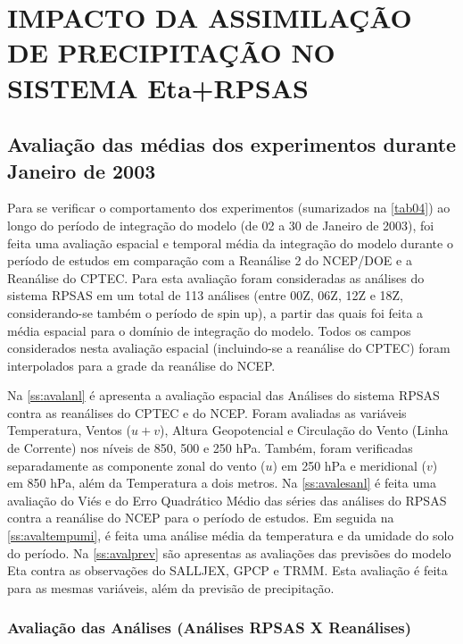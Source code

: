 \hypertarget{estilo:capitulo}{}
\chapter{IMPACTO DA ASSIMILAÇÃO DE PRECIPITAÇÃO NO SISTEMA Eta+RPSAS}
\label{ss:cap3}

\section{Avaliação das médias dos experimentos durante Janeiro de 2003}
\label{ss:avalmedia}

Para se verificar o comportamento dos experimentos (sumarizados na \autoref{tab04}) ao longo do período de integração do modelo (de 02 a 30 de Janeiro de 2003), foi feita uma avaliação espacial e temporal média da integração do modelo durante o período de estudos em comparação com a Reanálise 2 do NCEP/DOE e a Reanálise do CPTEC. Para esta avaliação foram consideradas as análises do sistema RPSAS em um total de 113 análises (entre 00Z, 06Z, 12Z e 18Z, considerando-se também  o período de spin up), a partir das quais foi feita a média espacial para o domínio de integração do modelo. Todos os campos considerados nesta avaliação espacial (incluindo-se a reanálise do CPTEC) foram interpolados para a grade da reanálise do NCEP. 

Na \autoref{ss:avalanl} é apresenta a avaliação espacial das Análises do sistema RPSAS contra as reanálises do CPTEC e do NCEP. Foram avaliadas as variáveis Temperatura, Ventos ($u+v$), Altura Geopotencial e Circulação do Vento (Linha de Corrente) nos níveis de 850, 500 e 250 hPa. Também, foram verificadas separadamente as componente zonal do vento ($u$) em 250 hPa e meridional ($v$) em 850 hPa, além da Temperatura a dois metros. Na \autoref{ss:avalesanl} é feita uma avaliação do Viés e do Erro Quadrático Médio das séries das análises do RPSAS contra a reanálise do NCEP para o período de estudos. Em seguida na \autoref{ss:avaltempumi}, é feita uma análise média da temperatura e da umidade do solo do período. Na \autoref{ss:avalprev} são apresentas as avaliações das previsões do modelo Eta contra as observações do SALLJEX, GPCP e TRMM. Esta avaliação é feita para as mesmas variáveis, além da previsão de precipitação.

\subsection{Avaliação das Análises (Análises RPSAS X Reanálises)}
\label{ss:avalanl}

